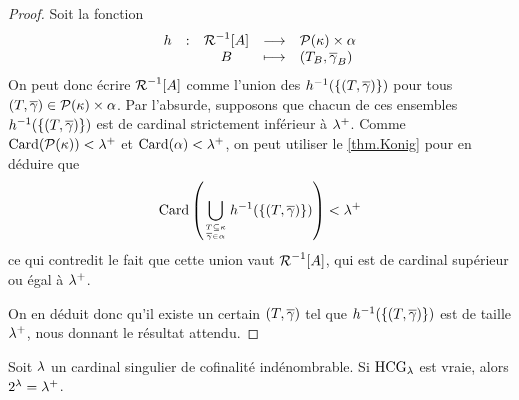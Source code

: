 \begin{proof}
  Soit la fonction
  \[\makeFun{h}
            {\LclR{\varPt}}{\powerset(\varCk)\times\varOa}
            {\varPtB}{(\varStT_{\varPtB},\overline\varOc_{\varPtB})}\]
  On peut donc écrire $\mathord{\mathrel{\mathcal{R}}}^{-1}[A]$ comme l'union des
  $h^{-1}(\{(T,\overline{\gamma})\})$ pour tous
  $(T,\overline{\gamma})\in\mathcal{P}(\kappa)\times\alpha$. Par l'absurde,
  supposons que chacun de ces ensembles $h^{-1}(\{(T,\overline{\gamma})\})$
  est de cardinal strictement inférieur à $\lambda^{+}$. Comme
  $\operatorname{Card}(\mathcal{P}(\kappa))<\lambda^{+}$ et $\operatorname{Card}(\alpha)<\lambda^{+}$, on
  peut utiliser le \cref{thm.Konig} pour en déduire que
  \[\Card\left(
  \bigcup_{\genfrac{}{}{0pt}{2}{\varStT\subseteq\varCk}{\overline\varOc\in\varOa}}
  h^{-1}(\{(\varStT,\overline\varOc)\})\right) < \SsC{\varCCl}\]
  ce qui contredit le fait que cette union vaut $\mathord{\mathrel{\mathcal{R}}}^{-1}[A]$, qui est
  de cardinal supérieur ou égal à $\lambda^{+}$.

  On en déduit donc qu'il existe un certain $(T,\overline{\gamma})$ tel que
  $h^{-1}(\{(T,\overline{\gamma})\})$ est de taille $\lambda^{+}$, nous
  donnant le résultat attendu.
\end{proof}

\begin{theorem}
  Soit $\lambda$ un cardinal singulier de cofinalité indénombrable. Si
  $\operatorname{HCG}_\lambda$ est vraie, alors $2^\lambda = \lambda^{+}$.
\end{theorem}

